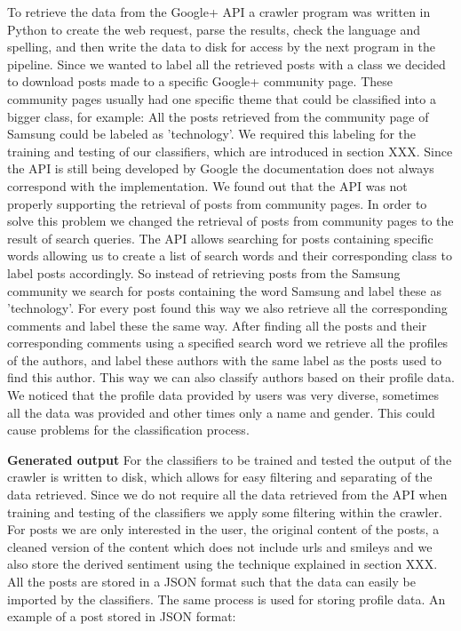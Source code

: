 To retrieve the data from the Google+ API a crawler program was written in Python to create the web request, parse the results, check the language and spelling, and then write the data to disk for access by the next program in the pipeline. Since we wanted to label all the retrieved posts with a class we decided to download posts made to a specific Google+ community page. These community pages usually had one specific theme that could be classified into a bigger class, for example: All the posts retrieved from the community page of Samsung could be labeled as 'technology'. We required this labeling for the training and testing of our classifiers, which are introduced in section XXX. 
Since the API is still being developed by Google the documentation does not always correspond with the implementation. We found out that the API was not properly supporting the retrieval of posts from community pages. In order to solve this problem we changed the retrieval of posts from community pages to the result of search queries. The API allows searching for posts containing specific words allowing us to create a list of search words and their corresponding class to label posts accordingly. So instead of retrieving posts from the Samsung community we search for posts containing the word Samsung and label these as 'technology'.
For every post found this way we also retrieve all the corresponding comments and label these the same way. After finding all the posts and their corresponding comments using a specified search word we retrieve all the profiles of the authors, and label these authors with the same label as the posts used to find this author. This way we can also classify authors based on their profile data. We noticed that the profile data provided by users was very diverse, sometimes all the data was provided and other times only a name and gender. This could cause problems for the classification process.

\textbf{Generated output}
For the classifiers to be trained and tested the output of the crawler is written to disk, which allows for easy filtering and separating of the data retrieved. Since we do not require all the data retrieved from the API when training and testing of the classifiers we apply some filtering within the crawler. For posts we are only interested in the user, the original content of the posts, a cleaned version of the content which does not include urls and smileys and we also store the derived sentiment using the technique explained in section XXX. All the posts are stored in a JSON format such that the data can easily be imported by the classifiers. The same process is used for storing profile data.  An example of a post stored in JSON format: 
